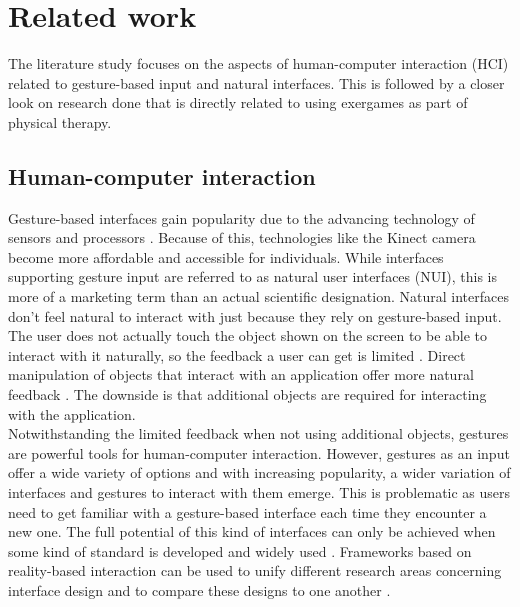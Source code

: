 \chapter{Related work}
\label{chapter: related work}

The literature study focuses on the aspects of human-computer interaction (HCI) related to gesture-based input and natural interfaces. This is followed by a closer look on research done that is directly related to using exergames as part of physical therapy.


\section{Human-computer interaction}

Gesture-based interfaces gain popularity due to the advancing technology of sensors and processors \cite{Jacob2008}. Because of this, technologies like the Kinect camera become more affordable and accessible for individuals. While interfaces supporting gesture input are referred to as natural user interfaces (NUI), this is more of a marketing term than an actual scientific designation. Natural interfaces don't feel natural to interact with just because they rely on gesture-based input. The user does not actually touch the object shown on the screen to be able to interact with it naturally, so the feedback a user can get is limited \cite{Norman2010}. Direct manipulation of objects that interact with an application offer more natural feedback \cite{Shneiderman2010}. The downside is that additional objects are required for interacting with the application.\\

Notwithstanding the limited feedback when not using additional objects, gestures are powerful tools for human-computer interaction. However, gestures as an input offer a wide variety of options and with increasing popularity, a wider variation of interfaces and gestures to interact with them emerge. This is problematic as users need to get familiar with a gesture-based interface each time they encounter a new one. The full potential of this kind of interfaces can only be achieved when some kind of standard is developed and widely used \cite{Norman2010}. Frameworks based on reality-based interaction can be used to unify different research areas concerning interface design and to compare these designs to one another \cite{Jacob2008}.\\

